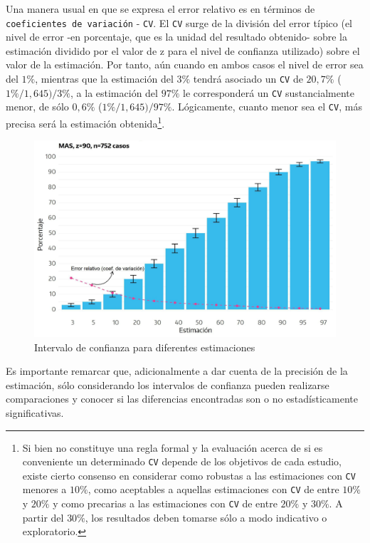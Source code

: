 \documentclass[
]{book}
\begin{document}
Una manera usual en que se expresa el error relativo es en términos de \texttt{coeficientes\ de\ variación} - \texttt{CV}. El \texttt{CV} surge de la división del error típico (el nivel de error -en porcentaje, que es la unidad del resultado obtenido- sobre la estimación dividido por el valor de z para el nivel de confianza utilizado) sobre el valor de la estimación. Por tanto, aún cuando en ambos casos el nivel de error sea del \(1\%\), mientras que la estimación del \(3\%\) tendrá asociado un \texttt{CV} de \(20,7\%\) (\(1\%/1,645)/3\%\), a la estimación del \(97\%\) le corresponderá un \texttt{CV} sustancialmente menor, de sólo \(0,6\%\) (\(1\%/1,645)/97\%\). Lógicamente, cuanto menor sea el \texttt{CV}, más precisa será la estimación obtenida\footnote{Si bien no constituye una regla formal y la evaluación acerca de si es conveniente un determinado \texttt{CV} depende de los objetivos de cada estudio, existe cierto consenso en considerar como robustas a las estimaciones con \texttt{CV} menores a \(10\%\), como aceptables a aquellas estimaciones con \texttt{CV} de entre \(10\%\) y \(20\%\) y como precarias a las estimaciones con \texttt{CV} de entre \(20\%\) y \(30\%\). A partir del \(30\%\), los resultados deben tomarse sólo a modo indicativo o exploratorio.}.

\begin{figure}

{\centering \includegraphics[width=1\linewidth]{imagenes/DT4_grafico4} 

}

\caption{Intervalo de confianza para diferentes estimaciones}\label{fig:Intervalodeconfianza}
\end{figure}

Es importante remarcar que, adicionalmente a dar cuenta de la precisión de la estimación, sólo considerando los intervalos de confianza pueden realizarse comparaciones y conocer si las diferencias encontradas son o no estadísticamente significativas.
\end{document}
